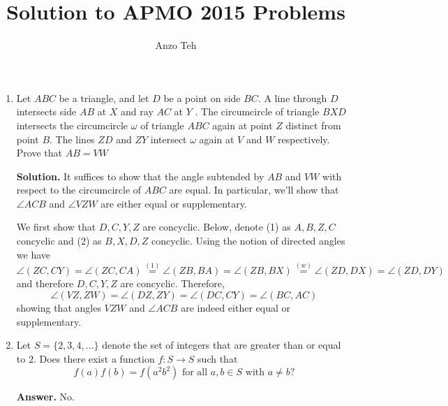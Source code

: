 \documentclass[11pt,a4paper]{article}
\begin{document}
\newcommand{\la}{\leftarrow}
\newcommand{\lra}{\leftrightarrow}
\newcommand{\bbN}{\mathbb{N}}
\newcommand{\bbZ}{\mathbb{Z}}
\newcommand{\dsum}{\displaystyle\sum}
\newcommand{\dprod}{\displaystyle\prod}


\title{Solution to APMO 2015 Problems}
\author{Anzo Teh}
\date{}
\maketitle

\begin{enumerate}
	\item Let $ABC$ be a triangle, and let $D$ be a point on side $BC$. A line through $D$ intersects side $AB$ at $X$ and ray $AC$ at $Y$ . The circumcircle of triangle $BXD$ intersects the circumcircle $\omega$ of triangle $ABC$ again at point $Z$ distinct from point $B$. The lines $ZD$ and $ZY$ intersect $\omega$ again at $V$ and $W$ respectively.
	Prove that $AB = VW$
	
	\textbf{Solution.} It suffices to show that the angle subtended by $AB$ and $VW$ with respect to the circumcircle of $ABC$ are equal. In particular, we'll show that $\angle ACB$ and $\angle VZW$ are either equal or supplementary. 
	
	We first show that $D, C, Y, Z$ are concyclic. Below, denote (1) as $A, B, Z, C$ concyclic and (2) as $B, X, D, Z$ concyclic. Using the notion of directed angles we have 
	\[
	\angle(ZC, CY)=\angle (ZC, CA)\stackrel{(1)}{=}\angle (ZB, BA) = \angle(ZB, BX)\stackrel{(w)}{=}\angle (ZD, DX) = \angle(ZD, DY)
	\]
	and therefore $D, C, Y, Z$ are concyclic. Therefore, 
	\[
	\angle (VZ, ZW)=\angle(DZ, ZY)=\angle (DC, CY)=\angle(BC, AC)
	\]
	showing that angles $VZW$ and $\angle ACB$ are indeed either equal or supplementary. 
	
	\item Let $S = \{2, 3, 4, \ldots\}$ denote the set of integers that are greater than or equal to $2$. Does there exist a function $f : S \to S$ such that \[f (a)f (b) = f (a^2 b^2 )\text{ for all }a, b \in S\text{ with }a \ne b?\]
	
	\textbf{Answer.} No. 
	

\end{enumerate}
\end{document}
